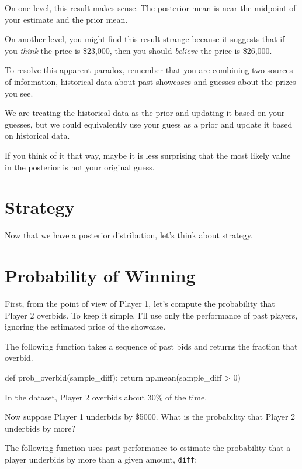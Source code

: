\documentclass[12pt]{book}
\theoremstyle{exercise}
\newcommand{\py}[1]{{\tt #1}}%
\begin{document}
On one level, this result makes sense.
The posterior mean is near the midpoint of your estimate and the prior mean.

On another level, you might find this result strange because it
suggests that if you {\em think} the price is \$23,000, then you
should {\em believe} the price is \$26,000.

To resolve this apparent paradox, remember that you are combining two
sources of information, historical data about past showcases and
guesses about the prizes you see.

We are treating the historical data as the prior and updating it
based on your guesses, but we could equivalently use your guess
as a prior and update it based on historical data.

If you think of it that way, maybe it is less surprising that the
most likely value in the posterior is not your original guess.

\section{Strategy}

Now that we have a posterior distribution, let's think about strategy.




\section{Probability of Winning}

First, from the point of view of Player 1, let's compute the probability that Player 2 overbids.
To keep it simple, I'll use only the performance of past players, ignoring the estimated price of the showcase.

The following function takes a sequence of past bids and returns the fraction that overbid.

\begin{code}
def prob_overbid(sample_diff):
    return np.mean(sample_diff > 0)
\end{code}

In the dataset, Player 2 overbids about 30\% of the time.

Now suppose Player 1 underbids by \$5000.
What is the probability that Player 2 underbids by more?

The following function uses past performance to estimate the probability that a player underbids by more than a given amount, \py{diff}:
\end{document}
